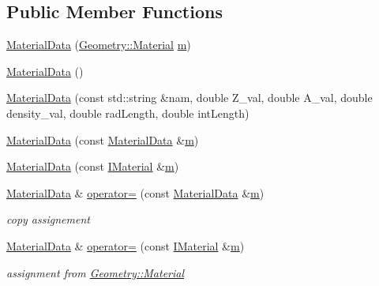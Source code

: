 \subsection*{Public Member Functions}
\begin{DoxyCompactItemize}
\item 
\hyperlink{class_d_d4hep_1_1_d_d_rec_1_1_material_data_a13401e43c53f525dc9adc6b497c6f0e6}{Material\+Data} (\hyperlink{class_d_d4hep_1_1_geometry_1_1_material}{Geometry\+::\+Material} \hyperlink{_volumes_8cpp_a6fc379aaec47ce424b00d8ffda2a6c59}{m})
\item 
\hyperlink{class_d_d4hep_1_1_d_d_rec_1_1_material_data_ae227988b42f40660dd9d59e0caecb1ef}{Material\+Data} ()
\item 
\hyperlink{class_d_d4hep_1_1_d_d_rec_1_1_material_data_adff4c3a5132ae55171ed9801b107d5fe}{Material\+Data} (const std\+::string \&nam, double Z\+\_\+val, double A\+\_\+val, double density\+\_\+val, double rad\+Length, double int\+Length)
\item 
\hyperlink{class_d_d4hep_1_1_d_d_rec_1_1_material_data_acd85ff17497787b8da9cf855d56cb663}{Material\+Data} (const \hyperlink{class_d_d4hep_1_1_d_d_rec_1_1_material_data}{Material\+Data} \&\hyperlink{_volumes_8cpp_a6fc379aaec47ce424b00d8ffda2a6c59}{m})
\item 
\hyperlink{class_d_d4hep_1_1_d_d_rec_1_1_material_data_afc8ce700606b7690b0f86ba6e9db3787}{Material\+Data} (const \hyperlink{class_d_d_surfaces_1_1_i_material}{I\+Material} \&\hyperlink{_volumes_8cpp_a6fc379aaec47ce424b00d8ffda2a6c59}{m})
\item 
\hyperlink{class_d_d4hep_1_1_d_d_rec_1_1_material_data}{Material\+Data} \& \hyperlink{class_d_d4hep_1_1_d_d_rec_1_1_material_data_af4fcb3ac628a39c87c895bcb478ac30d}{operator=} (const \hyperlink{class_d_d4hep_1_1_d_d_rec_1_1_material_data}{Material\+Data} \&\hyperlink{_volumes_8cpp_a6fc379aaec47ce424b00d8ffda2a6c59}{m})
\begin{DoxyCompactList}\small\item\em copy assignement \end{DoxyCompactList}\item 
\hyperlink{class_d_d4hep_1_1_d_d_rec_1_1_material_data}{Material\+Data} \& \hyperlink{class_d_d4hep_1_1_d_d_rec_1_1_material_data_a7340be27bee4c64179f6114d698c7f65}{operator=} (const \hyperlink{class_d_d_surfaces_1_1_i_material}{I\+Material} \&\hyperlink{_volumes_8cpp_a6fc379aaec47ce424b00d8ffda2a6c59}{m})
\begin{DoxyCompactList}\small\item\em assignment from \hyperlink{class_d_d4hep_1_1_geometry_1_1_material}{Geometry\+::\+Material} \end{DoxyCompactList}\item 

\end{DoxyCompactItemize}
